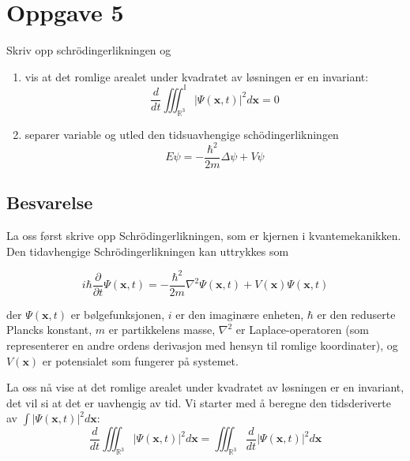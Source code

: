 \section{Oppgave 5}
Skriv opp schrödingerlikningen og
\begin{enumerate}
    \item vis at det romlige arealet under kvadratet av løsningen er en invariant: \\ \begin{equation*}  \frac{d}{d t} \iiint_{\mathbb{R}^{3}}^{\mathbb{I}}|\Psi(\mathbf{x}, t)|^{2} d \mathbf{x}=0    \end{equation*}
    \item separer variable og utled den tidsuavhengige schödingerlikningen \\ \begin{equation*} E \psi=-\frac{\hbar^{2}}{2 m} \Delta \psi+V \psi    \end{equation*}
\end{enumerate}

\subsection*{Besvarelse}

La oss først skrive opp Schrödingerlikningen, som er kjernen i kvantemekanikken. Den tidavhengige Schrödingerlikningen kan uttrykkes som

\begin{equation*}
i\hbar\frac{\partial}{\partial t} \Psi(\mathbf{x},t) = -\frac{\hbar^2}{2m}\nabla^2\Psi(\mathbf{x},t) + V(\mathbf{x})\Psi(\mathbf{x},t)
\end{equation*}

der $\Psi(\mathbf{x},t)$ er bølgefunksjonen, $i$ er den imaginære enheten, $\hbar$ er den reduserte Plancks konstant, $m$ er partikkelens masse, $\nabla^2$ er Laplace-operatoren (som representerer en andre ordens derivasjon med hensyn til romlige koordinater), og $V(\mathbf{x})$ er potensialet som fungerer på systemet.

La oss nå vise at det romlige arealet under kvadratet av løsningen er en invariant, det vil si at det er uavhengig av tid. Vi starter med å beregne den tidsderiverte av $\int|\Psi(\mathbf{x}, t)|^{2} d \mathbf{x}$:
\begin{equation*}
\frac{d}{d t} \iiint_{\mathbb{R}^{3}} |\Psi(\mathbf{x}, t)|^{2} d \mathbf{x} = \iiint_{\mathbb{R}^{3}} \frac{d}{dt} |\Psi(\mathbf{x}, t)|^{2} d \mathbf{x}
\end{equation*}

